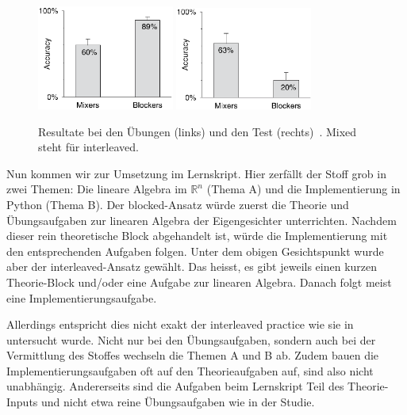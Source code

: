 \begin{figure}[ht]
	\centering
	\includegraphics[width=0.4\textwidth]{images/interleaved_practice}
	\hfill
	\includegraphics[width=0.4\textwidth]{images/interleaved_test}
	\caption{Resultate bei den Übungen (links) und den Test (rechts)~\cite{Rohrer2007}. \glqq{}Mixed\grqq{} steht für \glqq{}interleaved\grqq{}.}
	\label{fig:interleaved}
\end{figure}

Nun kommen wir zur Umsetzung im Lernskript.
Hier zerfällt der Stoff grob in zwei Themen: Die lineare Algebra im $\mathbb R^n$ (Thema A) und die Implementierung in Python (Thema B).
Der \glqq{}blocked\grqq{}-Ansatz würde zuerst die Theorie und Übungsaufgaben zur linearen Algebra der Eigengesichter unterrichten.
Nachdem dieser rein theoretische Block abgehandelt ist, würde die Implementierung mit den entsprechenden Aufgaben folgen.
Unter dem obigen Gesichtspunkt wurde aber der \glqq{}interleaved\grqq{}-Ansatz gewählt.
Das heisst, es gibt jeweils einen kurzen Theorie-Block und/oder eine Aufgabe zur linearen Algebra.
Danach folgt meist eine Implementierungsaufgabe.

Allerdings entspricht dies nicht exakt der \glqq{}interleaved practice\grqq{} wie sie in \cite{Rohrer2007} untersucht wurde.
Nicht nur bei den Übungsaufgaben, sondern auch bei der Vermittlung des Stoffes wechseln die Themen A und B ab.
Zudem bauen die Implementierungsaufgaben oft auf den Theorieaufgaben auf, sind also nicht unabhängig.
Andererseits sind die Aufgaben beim Lernskript Teil des Theorie-Inputs und nicht etwa reine Übungsaufgaben wie in der Studie.